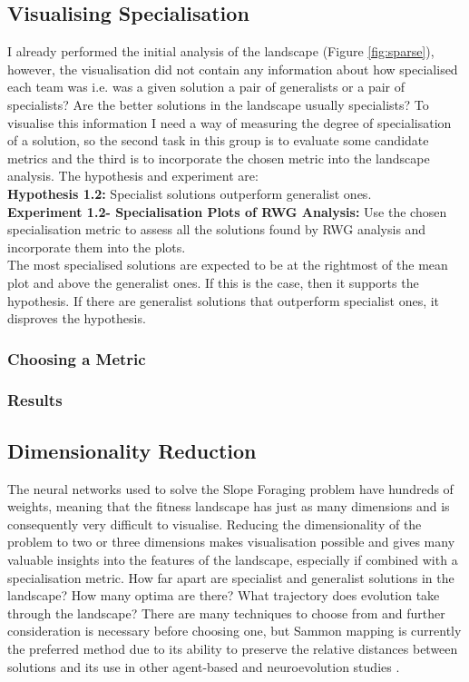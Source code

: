 \documentclass[12pt]{article}
\begin{document}
\subsection{Visualising Specialisation}

I already performed the initial analysis of the landscape (Figure \ref{fig:sparse}), however, the visualisation did not contain any information about how specialised each team was i.e. was a given solution a pair of generalists or a pair of specialists? 
Are the better solutions in the landscape usually specialists? 
To visualise this information I need a way of measuring the degree of specialisation of a solution, so the second task in this group is to evaluate some candidate metrics and the third is to incorporate the chosen metric into the landscape analysis.
The hypothesis and experiment are:\\

\textbf{Hypothesis 1.2:} Specialist solutions outperform generalist ones.\\

\textbf{Experiment 1.2- Specialisation Plots of RWG Analysis:}  Use the chosen specialisation metric to assess all the solutions found by RWG analysis and incorporate them into the plots.\\

The most specialised solutions are expected to be at the rightmost of the mean plot and above the generalist ones.
If this is the case, then it supports the hypothesis.
If there are generalist solutions that outperform specialist ones, it disproves the hypothesis.

\subsubsection{Choosing a Metric}

\subsubsection{Results}

\subsection{Dimensionality Reduction}

The neural networks used to solve the Slope Foraging problem have hundreds of weights, meaning that the fitness landscape has just as many dimensions and is consequently very difficult to visualise.
Reducing the dimensionality of the problem to two or three dimensions makes visualisation possible and gives many valuable insights into the features of the landscape, especially if combined with a specialisation metric.
How far apart are specialist and generalist solutions in the landscape?
How many optima are there?
What trajectory does evolution take through the landscape?
There are many techniques to choose from \cite{veerapen:GPEM:2018} and further consideration is necessary before choosing one, but Sammon mapping \cite{sammon:IEEETR:1969} is currently the preferred method due to its ability to preserve the relative distances between solutions and its use in other agent-based and neuroevolution studies \cite{kim:GECCO:2003, risi:AB:2010}.
\end{document}
